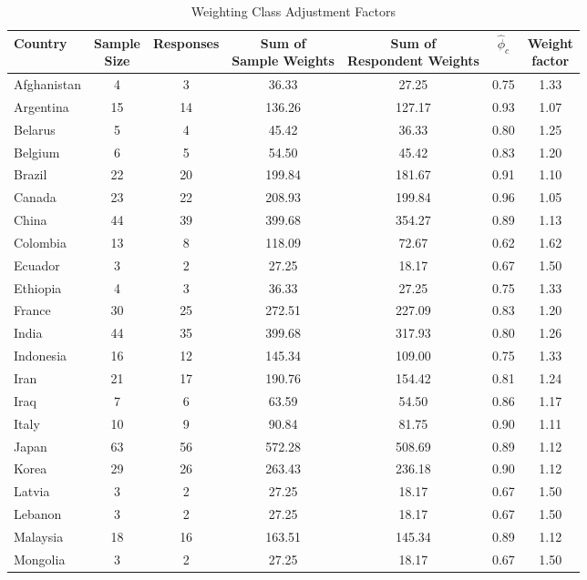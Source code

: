 \documentclass{article}
\theoremstyle{definition}
\begin{document}
\begin{table}[H]
\centering
\caption{Weighting Class Adjustment Factors}
\begin{tabular}{l|cccccc}
Country & \shortstack{Sample \\ Size} & Responses & \shortstack{Sum of \\ Sample Weights} & \shortstack{Sum of \\ Respondent Weights} & $\hat{\phi}_c$ & \shortstack{Weight \\ factor} \\
  \hline
Afghanistan &   4 &   3 & 36.33 & 27.25 & 0.75 & 1.33 \\
Argentina &  15 &  14 & 136.26 & 127.17 & 0.93 & 1.07 \\
Belarus &   5 &   4 & 45.42 & 36.33 & 0.80 & 1.25 \\
Belgium &   6 &   5 & 54.50 & 45.42 & 0.83 & 1.20 \\
Brazil &  22 &  20 & 199.84 & 181.67 & 0.91 & 1.10 \\
Canada &  23 &  22 & 208.93 & 199.84 & 0.96 & 1.05 \\
China &  44 &  39 & 399.68 & 354.27 & 0.89 & 1.13 \\
Colombia &  13 &   8 & 118.09 & 72.67 & 0.62 & 1.62 \\
Ecuador &   3 &   2 & 27.25 & 18.17 & 0.67 & 1.50 \\
Ethiopia &   4 &   3 & 36.33 & 27.25 & 0.75 & 1.33 \\
France &  30 &  25 & 272.51 & 227.09 & 0.83 & 1.20 \\
India &  44 &  35 & 399.68 & 317.93 & 0.80 & 1.26 \\
Indonesia &  16 &  12 & 145.34 & 109.00 & 0.75 & 1.33 \\
Iran &  21 &  17 & 190.76 & 154.42 & 0.81 & 1.24 \\
Iraq &   7 &   6 & 63.59 & 54.50 & 0.86 & 1.17 \\
Italy &  10 &   9 & 90.84 & 81.75 & 0.90 & 1.11 \\
Japan &  63 &  56 & 572.28 & 508.69 & 0.89 & 1.12 \\
Korea  &  29 &  26 & 263.43 & 236.18 & 0.90 & 1.12 \\
Latvia &   3 &   2 & 27.25 & 18.17 & 0.67 & 1.50 \\
Lebanon &   3 &   2 & 27.25 & 18.17 & 0.67 & 1.50 \\
Malaysia &  18 &  16 & 163.51 & 145.34 & 0.89 & 1.12 \\
Mongolia &   3 &   2 & 27.25 & 18.17 & 0.67 & 1.50 \\

\end{tabular}
\end{table}
\end{document}
